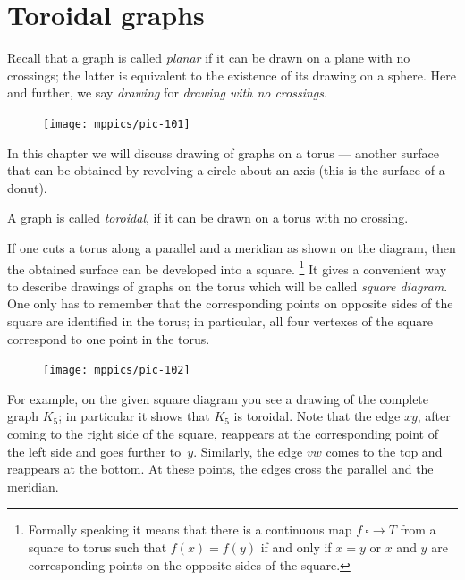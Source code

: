 \chapter{Toroidal graphs}

Recall that a graph is called \emph{planar} if it can be drawn on a plane with no crossings;
the latter is equivalent to the existence of its drawing on a sphere.
Here and further, we say \emph{drawing} for \emph{drawing with no crossings}.  

\begin{figure}
\vskip-2mm
\centering
\texttt{[image: mppics/pic-101]}
\end{figure}

In this chapter we will discuss drawing of graphs on a torus --- another surface that can be obtained by revolving a circle about an axis (this is the surface of a donut).

A graph is called \emph{toroidal}, if it can be drawn on a torus with no crossing.

If one cuts a torus along a parallel and a meridian as shown on the diagram,
then the obtained surface can be developed into a square.%
\footnote{Formally speaking it means that there is a continuous map $f\:\square\to T$ from a square to torus  such that $f(x)=f(y)$ if and only if $x=y$ or $x$ and $y$ are corresponding points on the opposite sides of the square.}
It gives a convenient way to describe drawings of graphs on the torus which will be called \emph{square diagram}.
One only has to remember that the corresponding points on opposite sides of the square are identified in the torus;
in particular, all four vertexes of the square correspond to one point in the torus.

{

\begin{figure}
\vskip-4mm
\centering
\texttt{[image: mppics/pic-102]}
\end{figure}

For example, on the given square diagram you see a drawing of the  complete graph $K_5$;
in particular it shows that $K_5$ is toroidal.
Note that the edge $xy$,
after coming to the right side of the square, reappears at the corresponding point of the left side and goes further to~$y$.
Similarly, the edge $vw$ comes to the top and reappears at the bottom.
At these points, the edges cross the parallel and the meridian.

}

